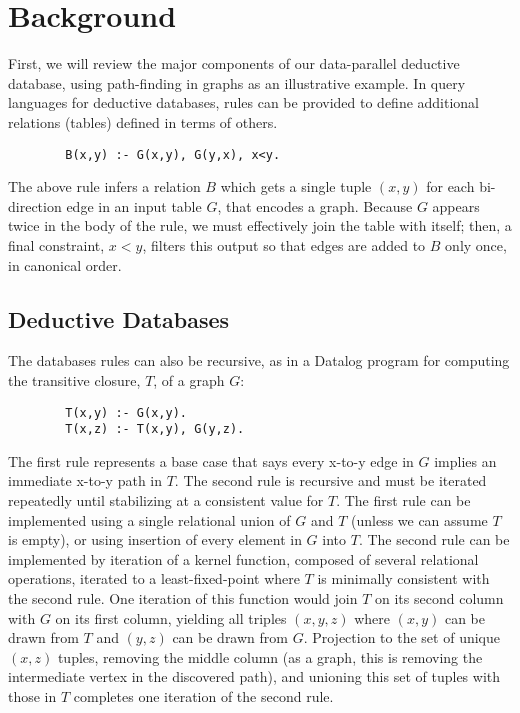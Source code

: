 \section{Background}
\label{sec:background}
%
First, we will review the major components of our data-parallel deductive database, using path-finding in graphs as an illustrative example. In query languages for deductive databases, rules can be provided to define additional relations (tables) defined in terms of others.

\begin{verbatim}
        B(x,y) :- G(x,y), G(y,x), x<y.
\end{verbatim}

The above rule infers a relation $B$ which gets a single tuple $(x,y)$ for each bi-direction edge in an input table $G$, that encodes a graph. Because $G$ appears twice in the body of the rule, we must effectively join the table with itself; then, a final constraint, $x<y$, filters this output so that edges are added to $B$ only once, in canonical order.

\subsection{Deductive Databases}

The databases rules can also be recursive, as in a Datalog program for computing the transitive closure, $T$, of a graph $G$: 

\begin{verbatim}
        T(x,y) :- G(x,y).
        T(x,z) :- T(x,y), G(y,z).
\end{verbatim}

The first rule represents a base case that says every x-to-y edge in $G$ implies an immediate x-to-y path in $T$. The second rule is recursive and must be iterated repeatedly until stabilizing at a consistent value for $T$. The first rule can be implemented using a single relational union of $G$ and $T$ (unless we can assume $T$ is empty), or using insertion of every element in $G$ into $T$. The second rule can be implemented by iteration of a kernel function, composed of several relational operations, iterated to a least-fixed-point where $T$ is minimally consistent with the second rule. One iteration of this function would join $T$ on its second column with $G$ on its first column, yielding all triples $(x,y,z)$ where $(x,y)$ can be drawn from $T$ and $(y,z)$ can be drawn from $G$. Projection to the set of unique $(x,z)$ tuples, removing the middle column (as a graph, this is removing the intermediate vertex in the discovered path), and unioning this set of tuples with those in $T$ completes one iteration of the second rule.  

